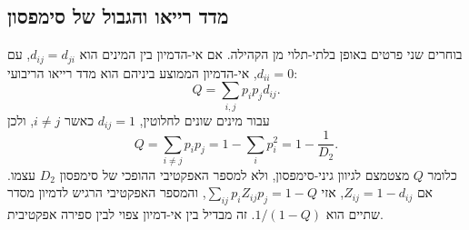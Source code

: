\subsection*{מדד רייאו והגבול של סימפסון}
בוחרים שני פרטים באופן בלתי-תלוי מן הקהילה. אם אי-הדמיון בין המינים הוא \(d_{ij}=d_{ji}\), עם \(d_{ii}=0\), אי-הדמיון הממוצע ביניהם הוא מדד רייאו הריבועי:
\begin{equation}\label{eq:he-bio-rao}
Q=\sum_{i,j}p_i p_j d_{ij}.
\end{equation}
עבור מינים שונים לחלוטין, \(d_{ij}=1\) כאשר \(i\ne j\), ולכן
\begin{equation}\label{eq:he-bio-rao-simpson}
Q=\sum_{i\ne j}p_i p_j=1-\sum_i p_i^2=1-\frac{1}{D_2}.
\end{equation}
כלומר \(Q\) מצטמצם לגיוון גיני-סימפסון, ולא למספר האפקטיבי ההופכי של סימפסון \(D_2\) עצמו. אם \(Z_{ij}=1-d_{ij}\), אזי \(\sum_{ij}p_iZ_{ij}p_j=1-Q\), והמספר האפקטיבי הרגיש לדמיון מסדר שתיים הוא \(1/(1-Q)\). זה מבדיל בין אי-דמיון צפוי לבין ספירה אפקטיבית.

